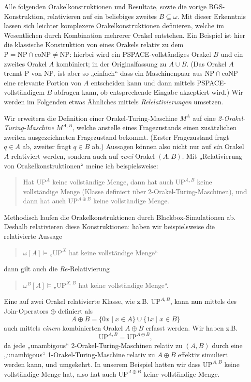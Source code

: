 \documentclass[nofonts]{uebung}
\theoremstyle{definition}
\def\P{\ensuremath{\mathrm{P}}}
\def\NP{\ensuremath{\mathrm{NP}}}
\def\UP{\ensuremath{\mathrm{UP}}}
\def\coNP{\ensuremath{\mathrm{coNP}}}
\begin{document}
Alle folgenden Orakelkonstruktionen und Resultate, sowie die vorige BGS-Konstruktion, relativieren auf ein beliebiges zweites $B\subseteq\omega$.
Mit dieser Erkenntnis lassen sich leichter komplexere Orakelkonstruktionen definieren, welche im Wesentlichen durch Kombination mehrerer Orakel entstehen. Ein Beispiel ist hier die klassische Konstruktion von \citeauthor{baker_relativizations_1975} eines Orakels relativ zu dem $\P=\NP\cap\coNP\neq\NP$: hierbei wird ein PSPACE-vollständiges Orakel $B$ und ein zweites Orakel $A$ kombiniert; in der Originalfassung zu $A\cup B$. (Das Orakel $A$ trennt $\P$ von $\NP$, ist aber so „einfach“ dass ein Maschinenpaar aus $\NP\cap\coNP$ eine relevante Portion von $A$ entscheiden kann und dann mittels PSPACE-vollständigem $B$ abfragen kann, ob entsprechende Eingabe akzeptiert wird.) Wir werden im Folgenden etwas Ähnliches mittels \emph{Relelativierungen} umsetzen.

Wir erweitern die Definition einer Orakel-Turing-Maschine $M^A$ auf eine \emph{2-Orakel-Turing-Maschine} $M^{A,B}$, welche anstelle eines Fragezustands einen zusätzlichen zweiten ausgezeichneten Fragezustand bekommt. (Erster Fragezustand fragt $q\in A$ ab, zweiter fragt $q\in B$ ab.)
Aussagen können also nicht nur auf \emph{ein} Orakel $A$ relativiert werden, sondern auch auf \emph{zwei} Orakel $(A,B)$.
Mit „Relativierung von Orakelkonstruktionen“ meine ich beispielsweise: 
\begin{quote}
    Hat $\UP^A$ keine vollständige Menge, dann hat auch $\UP^{A,B}$ keine vollständige Menge (Klasse definiert über 2-Orakel-Turing-Maschinen), und dann hat auch $\UP^{A\oplus B}$ keine vollständige Menge.
\end{quote}

Methodisch laufen die Orakelkonstruktionen durch Blackbox-Simulationen ab. Deshalb relativieren diese Konstruktionen:
haben wir beispielsweise die relativierte Aussage \begin{quote}$\omega[A]\vDash „\UP^X$ hat keine vollständige Menge“\end{quote}  dann gilt auch die \emph{Re-}Relativierung \begin{quote}$\omega^B[A]\vDash „\UP^{X,B}$ hat keine vollständige Menge“.\end{quote}
Eine auf zwei Orakel relativierte Klasse, wie z.B. $\UP^{A,B}$, kann nun mittels des Join-Operators $\oplus$ definiert als
\[ A\oplus B = \{0x\mid x\in A\}\cup\{1x\mid x\in B\} \] 
auch mittels \emph{einem} kombinierten Orakel $A\oplus B$ erfasst werden. Wir haben z.B.
\[ \UP^{A,B} = \UP^{A\oplus B}, \]
da jede „unambigous“ 2-Orakel-Turing-Maschinen relativ zu $(A,B)$ durch eine „unambigous“ 1-Orakel-Turing-Maschine relativ zu $A\oplus B$ effektiv simuliert werden kann, und umgekehrt.
In unserem Beispiel hatten wir dass $\UP^{A,B}$ keine vollständige Menge hat, also hat auch $\UP^{A\oplus B}$ keine vollständige Menge.
\end{document}
